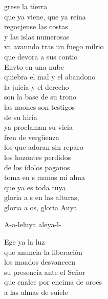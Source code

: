 \begin{cancion}%
	grese la tierra \\
	\jump
que ya viene, que ya reina\\
	regocjense las costas \\
	\jump
y las islas numerosas\\
	va avanndo tras un fuego milrio\\
	que devora a sus contio \\
	\jump
	Envto en una nube \\
	\jump
quiebra el mal y el abandono\\
	la juicia y el derecho \\
	\jump
son la base de su trono\\
	las naones son testigos \\
	de su hiria\\
	ya proclaman su vicia \\
	\jump
	fren de vergüenza \\
	\jump
los que adoran sin reparo\\
	los hozontes perdidos \\
	\jump
de los ídolos paganos\\
	toma en s manos mi alma \\
	que ya es toda tuya\\
	gloria a s en las alturas, \\
	gloria a os, gloria Auya.\jump\\
	\begin{chorus}%
		A-a-leluya aleya-l- \jump\\
	\end{chorus}%
	Ege ya la luz \\
	\jump
que anuncia la liberación\\
	los maados desvanecen \\
	\jump
su presencia ante el Señor\\
	que enalce por encima de oroes\\
	a las almas de suiele \\

\end{cancion}
